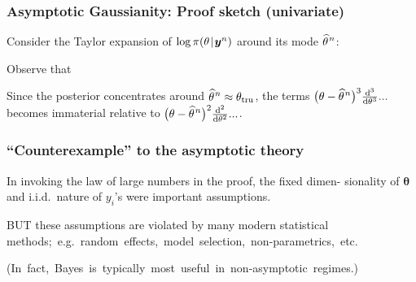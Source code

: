 \documentclass[18pt]{beamer}
\newcommand{\defineTightItemizeSpacing}{%
	\setlength{\abovedisplayskip}{.25\baselineskip}%
	\setlength{\belowdisplayskip}{.25\baselineskip}%
}
\newenvironment{tightEquation*}{%
	\defineTightItemizeSpacing%
	\begin{equation*}
}{
	\end{equation*} \ignorespacesafterend
}
\newcommand{\given}{\thinnerspace | \thinnerspace}
\newcommand{\diff}{\operatorname{\mathrm{d}}\!{}}
\newcommand{\thinnerspace}{\mskip.5\thinmuskip}
\newcommand{\expectation}{\mathbb{E}}
\newcommand{\truthSub}{\mathrm{tru}}
\newcommand{\density}{\pi}
\newcommand{\likelihood}{L}
\newcommand{\by}{\bm{y}}
\newcommand{\btheta}{\bm{\theta}}
\begin{document}
\newcommand{\samplesizeDependentMap}{\widehat{\theta}^{\text{\raisebox{.1ex}{$\thinnerspace n$}}}}
\begin{frame}
\frametitle{Asymptotic Gaussianity: Proof sketch (univariate)}
Consider the Taylor expansion of $\log \density(\theta \given \by^n)$ around its mode $\samplesizeDependentMap$:
\begin{tightEquation*}
\end{tightEquation*}
\pause%
Observe that 
\begin{tightEquation*}
\end{tightEquation*}
\pause%
Since the posterior concentrates around $\samplesizeDependentMap \approx \theta_\truthSub$, the terms $\big( \theta - \samplesizeDependentMap \big)^3 \frac{\diff^3}{\diff \theta^3} ...$ becomes immaterial relative to $\big( \theta - \samplesizeDependentMap \big)^2 \frac{\diff^2}{\diff \theta^2} ...$. 
\hfill \qedsymbol
\end{frame}

\begin{frame}
\frametitle{``Counterexample'' to the asymptotic theory}
In invoking the law of large numbers in the proof, the fixed dimen- sionality of $\btheta$ and i.i.d.\ nature of $y_i$'s were important assumptions.

\pause%
B{\small UT} these assumptions are violated by many modern statistical \mbox{methods; e.g.\ random effects, model selection, non-parametrics, etc.}

\pause%
\mbox{(In fact, Bayes is typically most useful in non-asymptotic regimes.)}
\end{frame}
\end{document}
